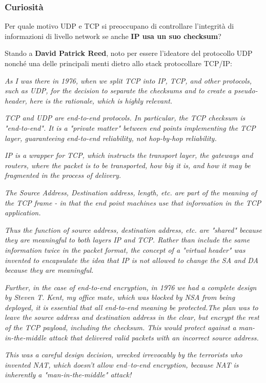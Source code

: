 \documentclass[11pt,a4paper,oneside]{book}
\theoremstyle{definition}
\begin{document}
\pagebreak

\subsubsection{Curiosità}
Per quale motivo UDP e TCP si preoccupano di controllare l’integrità di informazioni di livello
network se anche \textbf{IP usa un suo checksum}?

Stando a \textbf{David Patrick Reed}, noto per essere l'ideatore del protocollo UDP nonché una delle principali menti dietro allo stack protocollare TCP/IP:

\textit{As I was there in 1976, when we split TCP into IP, TCP, and other protocols, such as UDP, for the decision to separate the checksums and
	to create a pseudo-header, here is the rationale, which is highly relevant.}

\textit{TCP and UDP are end-to-end protocols.   In particular, the TCP
	checksum is "end-to-end". It is a "private matter" between end points
	implementing the TCP layer, guaranteeing end-to-end reliability, not
	hop-by-hop reliability.}

\textit{IP is a wrapper for TCP, which instructs the transport layer, the
	gateways and routers, where the packet is to be transported, how big it
	is, and how it may be fragmented in the process of delivery.}

\textit{The Source Address, Destination address, length, etc. are part of the
	meaning of the TCP frame - in that the end point machines use that
	information in the TCP application.}

\textit{Thus the function of source address, destination address,
	etc. are "shared" because they are
	meaningful to both layers IP and TCP. Rather than include the same
	information twice in the packet format, the concept of a "virtual
	header" was invented to encapsulate the idea that IP is not allowed to
	change the SA and DA because they are meaningful.}

\textit{Further, in the case of end-to-end encryption, in 1976 we had a complete
	design by Steven T. Kent, my office mate, which was blocked by NSA from
	being deployed, it is essential that all end-to-end meaning be
	protected.The plan was to leave the source address and destination address in the clear, but  encrypt the rest of the TCP payload, including the checksum.  This would
	protect against a man-in-the-middle attack that delivered valid packets
	with an incorrect source address.}

\textit{This was a careful design decision, wrecked irrevocably by the
	terrorists who invented NAT, which doesn't allow end--to-end encryption,
	because NAT is inherently a "man-in-the-middle" attack!}
\end{document}
